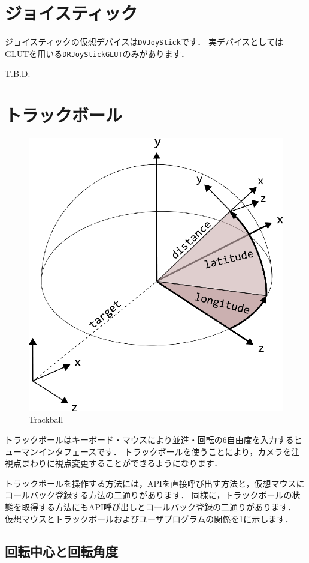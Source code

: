 \section{\KLUDGE ジョイスティック}

\KLUDGE ジョイスティックの仮想デバイスは\texttt{DVJoyStick}\KLUDGE です．
\KLUDGE 実デバイスとしてはGLUT\KLUDGE を用いる\texttt{DRJoyStickGLUT}\KLUDGE のみがあります．

T.B.D. 

\section{\KLUDGE トラックボール}

\begin{figure}[t]
\begin{center}
\includegraphics[width=.5\hsize]{fig/hitrackball.eps}
\end{center}
\caption{Trackball}
\label{fig_trackball}
\end{figure}

\KLUDGE トラックボールはキーボード・マウスにより並進・回転の6\KLUDGE 自由度を入力するヒューマンインタフェースです．
\KLUDGE トラックボールを使うことにより，カメラを注視点まわりに視点変更することができるようになります．

\KLUDGE トラックボールを操作する方法には，API\KLUDGE を直接呼び出す方法と，仮想マウスにコールバック登録する方法の二通りがあります．
\KLUDGE 同様に，トラックボールの状態を取得する方法にもAPI\KLUDGE 呼び出しとコールバック登録の二通りがあります．
\KLUDGE 仮想マウスとトラックボールおよびユーザプログラムの関係を\figurename\ref{fig_trackball}\KLUDGE に示します．


\subsection*{\KLUDGE 回転中心と回転角度}


